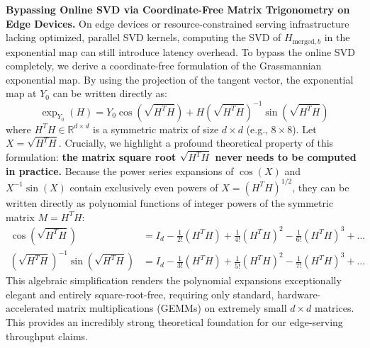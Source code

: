 \textbf{Bypassing Online SVD via Coordinate-Free Matrix Trigonometry on Edge Devices.}
On edge devices or resource-constrained serving infrastructure lacking optimized, parallel SVD kernels, computing the SVD of $H_{\text{merged}, b}$ in the exponential map can still introduce latency overhead. To bypass the online SVD completely, we derive a coordinate-free formulation of the Grassmannian exponential map. By using the projection of the tangent vector, the exponential map at $Y_0$ can be written directly as:
\begin{equation}
    \exp_{Y_0}(H) = Y_0 \cos\left(\sqrt{H^T H}\right) + H \left(\sqrt{H^T H}\right)^{-1} \sin\left(\sqrt{H^T H}\right)
\end{equation}
where $H^T H \in \mathbb{R}^{d \times d}$ is a symmetric matrix of size $d \times d$ (e.g., $8 \times 8$). Let $X = \sqrt{H^T H}$. Crucially, we highlight a profound theoretical property of this formulation: \textbf{the matrix square root $\sqrt{H^T H}$ never needs to be computed in practice.} Because the power series expansions of $\cos(X)$ and $X^{-1}\sin(X)$ contain exclusively even powers of $X = (H^T H)^{1/2}$, they can be written directly as polynomial functions of integer powers of the symmetric matrix $M = H^T H$:
\begin{align}
    \cos\left(\sqrt{H^T H}\right) &= I_d - \frac{1}{2!} (H^T H) + \frac{1}{4!} (H^T H)^2 - \frac{1}{6!} (H^T H)^3 + \dots \\
    \left(\sqrt{H^T H}\right)^{-1}\sin\left(\sqrt{H^T H}\right) &= I_d - \frac{1}{3!} (H^T H) + \frac{1}{5!} (H^T H)^2 - \frac{1}{7!} (H^T H)^3 + \dots
\end{align}
This algebraic simplification renders the polynomial expansions exceptionally elegant and entirely square-root-free, requiring only standard, hardware-accelerated matrix multiplications (GEMMs) on extremely small $d \times d$ matrices. This provides an incredibly strong theoretical foundation for our edge-serving throughput claims.

